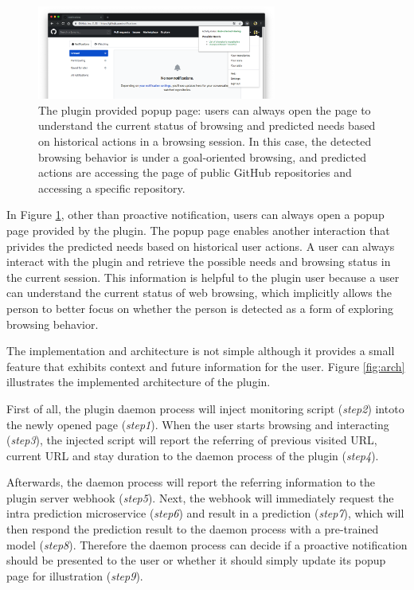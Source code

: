 \begin{figure}
    \centering
    \includegraphics[width=0.7\textwidth]{figures/plugin-predicting-result}
    \caption{The plugin provided popup page: users can always open the page
    to understand the current status of browsing and predicted needs based on
    historical actions in a browsing session. In this case, the detected browsing behavior
    is under a goal-oriented browsing, and predicted actions
    are accessing the page of public GitHub repositories and accessing a specific repository.}
    \label{fig:plugin-predict}
\end{figure}

In Figure \ref{fig:plugin-predict}, other than proactive notification, 
users can always open a popup page provided by the plugin.
The popup page enables another interaction that privides the predicted needs 
based on historical user actions. A user can always interact with the plugin and
retrieve the possible needs and browsing status in the current session.
This information is helpful to the plugin user because a user can understand
the current status of web browsing, which implicitly allows the person to better focus
on whether the person is detected as a form of exploring browsing behavior.

The implementation and architecture is not simple
although it provides a small feature that exhibits context and future information for the user.
Figure \ref{fig:arch} illustrates the implemented architecture of the plugin.

First of all, the plugin daemon process will inject monitoring script (\emph{step2}) intoto 
the newly opened page (\emph{step1}).
When the user starts browsing and interacting (\emph{step3}), the injected script will report the referring of
previous visited URL, current URL and stay duration to the daemon process of the plugin (\emph{step4}).

Afterwards, the daemon process will report the referring information to the plugin server webhook (\emph{step5}).
Next, the webhook will immediately request the intra prediction microservice (\emph{step6}) and result in a 
prediction (\emph{step7}), which will then respond the prediction result to the daemon process 
with a pre-trained model (\emph{step8}). Therefore the daemon process can decide 
if a proactive notification should be presented to the user or whether it should simply update its popup page
for illustration (\emph{step9}).

